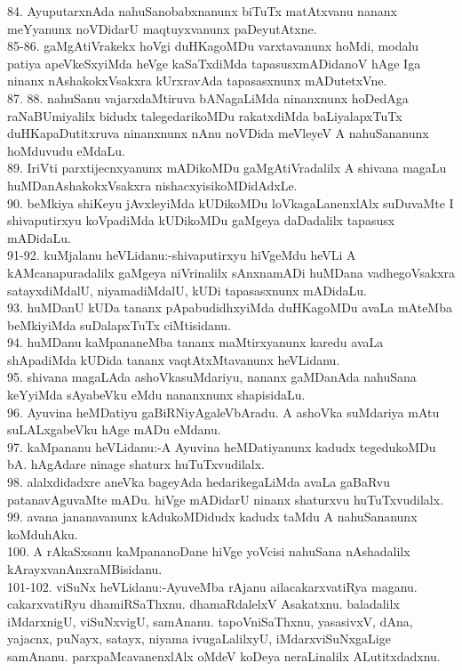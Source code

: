 \documentclass{article}
\begin{document}
84. AyuputarxnAda nahuSanobabxnanunx biTuTx matAtxvanu nananx meYyanunx noVDidarU maqtuyxvanunx paDeyutAtxne.\\
85-86. gaMgAtiVrakekx hoVgi duHKagoMDu varxtavanunx hoMdi, modalu patiya apeVkeSxyiMda heVge kaSaTxdiMda tapasusxmADidanoV hAge Iga ninanx nAshakokxVsakxra kUrxravAda tapasasxnunx mADutetxVne.\\
87. 88. nahuSanu vajarxdaMtiruva bANagaLiMda ninanxnunx hoDedAga raNaBUmiyalilx bidudx talegedarikoMDu rakatxdiMda baLiyalapxTuTx duHKapaDutitxruva ninanxnunx nAnu noVDida meVleyeV A nahuSananunx hoMduvudu eMdaLu.\\
89. IriVti parxtijecnxyanunx mADikoMDu gaMgAtiVradalilx A shivana magaLu huMDanAshakokxVsakxra nishacxyisikoMDidAdxLe.\\
90. beMkiya shiKeyu jAvxleyiMda kUDikoMDu loVkagaLanenxlAlx suDuvaMte I shivaputirxyu koVpadiMda kUDikoMDu gaMgeya daDadalilx tapasusx mADidaLu.\\
91-92. kuMjalanu heVLidanu:-shivaputirxyu hiVgeMdu heVLi A kAMcanapuradalilx gaMgeya niVrinalilx sAnxnamADi huMDana vadhegoVsakxra satayxdiMdalU, niyamadiMdalU, kUDi tapasasxnunx mADidaLu.\\
93. huMDanU kUDa tananx pApabudidhxyiMda duHKagoMDu avaLa mAteMba beMkiyiMda suDalapxTuTx ciMtisidanu.\\
94. huMDanu kaMpananeMba tananx maMtirxyanunx karedu avaLa shApadiMda kUDida tananx vaqtAtxMtavanunx heVLidanu.\\
95. shivana magaLAda ashoVkasuMdariyu, nananx gaMDanAda nahuSana keYyiMda sAyabeVku eMdu nananxnunx shapisidaLu.\\
96. Ayuvina heMDatiyu gaBiRNiyAgaleVbAradu. A ashoVka suMdariya mAtu suLALxgabeVku hAge mADu eMdanu.\\
97. kaMpananu heVLidanu:-A Ayuvina heMDatiyanunx kadudx tegedukoMDu bA. hAgAdare ninage shaturx huTuTxvudilalx.\\
98. alalxdidadxre aneVka bageyAda hedarikegaLiMda avaLa gaBaRvu patanavAguvaMte mADu. hiVge mADidarU ninanx shaturxvu huTuTxvudilalx.\\
99. avana jananavanunx kAdukoMDidudx kadudx taMdu A nahuSananunx koMduhAku.\\
100. A rAkaSxsanu kaMpananoDane hiVge yoVcisi nahuSana nAshadalilx kArayxvanAnxraMBisidanu.\\
101-102. viSuNx heVLidanu:-AyuveMba rAjanu ailacakarxvatiRya maganu. cakarxvatiRyu dhamiRSaThxnu. dhamaRdalelxV Asakatxnu. baladalilx iMdarxnigU, viSuNxvigU, samAnanu. tapoVniSaThxnu, yasasivxV, dAna, yajacnx, puNayx, satayx, niyama ivugaLalilxyU, iMdarxviSuNxgaLige samAnanu. parxpaMcavanenxlAlx oMdeV koDeya neraLinalilx ALutitxdadxnu.\\
\end{document}
